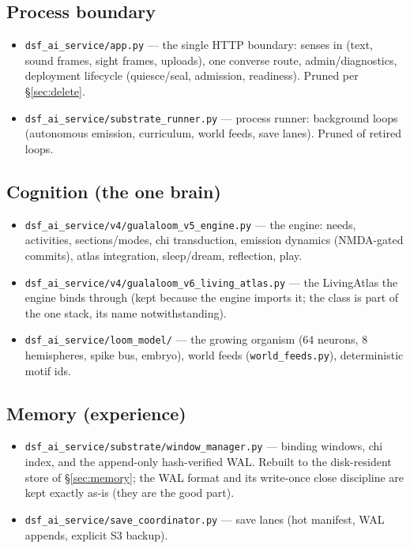 \documentclass[11pt]{article}
\begin{document}
\subsection{Process boundary}
\begin{itemize}[nosep]
  \item \texttt{dsf\_ai\_service/app.py} — the single HTTP boundary: senses
        in (text, sound frames, sight frames, uploads), one converse route,
        admin/diagnostics, deployment lifecycle (quiesce/seal, admission,
        readiness). Pruned per \S\ref{sec:delete}.
  \item \texttt{dsf\_ai\_service/substrate\_runner.py} — process runner:
        background loops (autonomous emission, curriculum, world feeds,
        save lanes). Pruned of retired loops.
\end{itemize}

\subsection{Cognition (the one brain)}
\begin{itemize}[nosep]
  \item \texttt{dsf\_ai\_service/v4/gualaloom\_v5\_engine.py} — the engine:
        needs, activities, sections/modes, chi transduction, emission
        dynamics (NMDA-gated commits), atlas integration, sleep/dream,
        reflection, play.
  \item \texttt{dsf\_ai\_service/v4/gualaloom\_v6\_living\_atlas.py} — the
        LivingAtlas the engine binds through (kept because the engine
        imports it; the class is part of the one stack, its name
        notwithstanding).
  \item \texttt{dsf\_ai\_service/loom\_model/} — the growing organism
        (64 neurons, 8 hemispheres, spike bus, embryo), world feeds
        (\texttt{world\_feeds.py}), deterministic motif ids.
\end{itemize}

\subsection{Memory (experience)}
\begin{itemize}[nosep]
  \item \texttt{dsf\_ai\_service/substrate/window\_manager.py} — binding
        windows, chi index, and the append-only hash-verified WAL. Rebuilt
        to the disk-resident store of \S\ref{sec:memory}; the WAL format and
        its write-once close discipline are kept exactly as-is (they are the
        good part).
  \item \texttt{dsf\_ai\_service/save\_coordinator.py} — save lanes (hot
        manifest, WAL appends, explicit S3 backup).
\end{itemize}
\end{document}
